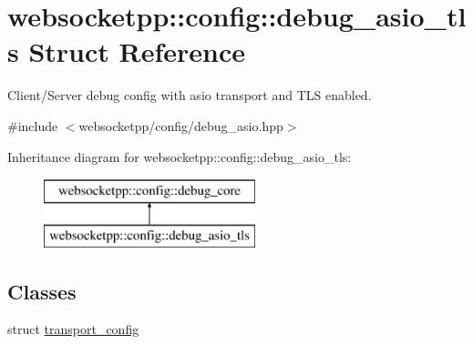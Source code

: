 \hypertarget{structwebsocketpp_1_1config_1_1debug__asio__tls}{}\section{websocketpp\+:\+:config\+:\+:debug\+\_\+asio\+\_\+tls Struct Reference}
\label{structwebsocketpp_1_1config_1_1debug__asio__tls}


Client/\+Server debug config with asio transport and T\+L\+S enabled.  




{\ttfamily \#include $<$websocketpp/config/debug\+\_\+asio.\+hpp$>$}

Inheritance diagram for websocketpp\+:\+:config\+:\+:debug\+\_\+asio\+\_\+tls\+:\begin{figure}[H]
\begin{center}
\leavevmode
\includegraphics[height=2.000000cm]{structwebsocketpp_1_1config_1_1debug__asio__tls}
\end{center}
\end{figure}
\subsection*{Classes}
\begin{DoxyCompactItemize}
\item 
struct \hyperlink{structwebsocketpp_1_1config_1_1debug__asio__tls_1_1transport__config}{transport\+\_\+config}
\end{DoxyCompactItemize}
